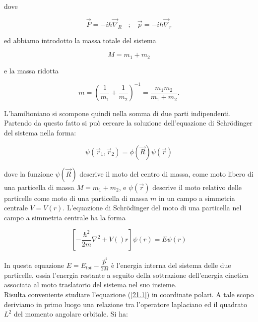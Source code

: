 \documentclass[a4paper,12pt,oneside]{book}
\begin{document}
dove

\begin{equation}
\vec{P}=-i\hbar\vec{\nabla}_R \ \ \ \ ;\ \ \ \ \vec{p}=-i\hbar\vec{\nabla}_r
\end{equation}

ed abbiamo introdotto la massa totale del sistema

\begin{equation}
M=m_1+m_2
\end{equation}

e la massa ridotta

\begin{equation}
m=\left(\frac{1}{m_1}+\frac{1}{m_2}\right)^{-1}=\frac{m_1m_2}{m_1+m_2}.
\end{equation}

L'hamiltoniano si scompone quindi nella somma di due parti indipendenti. Partendo 
da questo fatto si può cercare la soluzione dell'equazione di Schr\"{o}dinger del sistema nella forma:

\begin{equation}
\psi\left(\vec{r}_1,\vec{r}_2\right)=\phi(\vec{R})\psi(\vec{r})
\end{equation}

dove la funzione $\psi (\vec{R} )$ descrive il moto del centro di massa, come moto libero di una particella di massa $M=m_1+m_2$, e $\psi\left(\vec{r}\right)$ descrive il moto relativo delle particelle come moto di una particella di massa $m$ in un campo a simmetria centrale $V=V\left(r\right)$.
L'equazione di Schr\"{o}dinger del moto di una particella nel campo a simmetria centrale ha la forma

\begin{equation}
\left[-\frac{\hbar^2}{2m}\nabla^2+V\left(\right)r\right]\psi\left(r\right)=E\psi\left(r\right)
\label{21.1}
\end{equation} 

In questa equazione $E=E_{tot}-\frac{\vec{P}^2}{2M}$ è l'energia interna del sistema delle due particelle, ossia l'energia restante a seguito della sottrazione dell'energia cinetica associata al moto traslatorio del sistema nel suo insieme.\\
Risulta conveniente studiare l'equazione
(\ref{21.1}) in coordinate polari. A tale scopo deriviamo in primo luogo una relazione tra l'operatore laplaciano ed il quadrato $L^2$ del momento angolare orbitale. Si ha:
\end{document}
